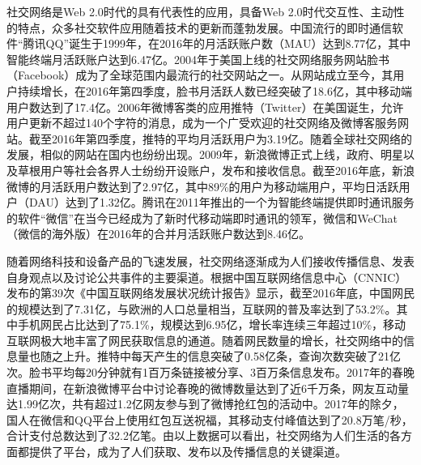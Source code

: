 社交网络是Web 2.0时代的具有代表性的应用，具备Web 2.0时代交互性、主动性的特点，众多社交软件应用随着技术的更新而蓬勃发展。中国流行的即时通信软件“腾讯QQ”诞生于1999年，在2016年的月活跃账户数（MAU）达到8.77亿，其中智能终端月活跃账户达到6.47亿。2004年于美国上线的社交网络服务网站脸书（Facebook）成为了全球范围内最流行的社交网站之一。从网站成立至今，其用户持续增长，在2016年第四季度，脸书月活跃人数已经突破了18.6亿，其中移动端用户数达到了17.4亿。2006年微博客类的应用推特（Twitter）在美国诞生，允许用户更新不超过140个字符的消息，成为一个广受欢迎的社交网络及微博客服务网站。截至2016年第四季度，推特的平均月活跃用户为3.19亿。随着全球社交网络的发展，相似的网站在国内也纷纷出现。2009年，新浪微博正式上线，政府、明星以及草根用户等社会各界人士纷纷开设账户，发布和接收信息。截至2016年底，新浪微博的月活跃用户数达到了2.97亿，其中89\%的用户为移动端用户，平均日活跃用户（DAU）达到了1.32亿。腾讯在2011年推出的一个为智能终端提供即时通讯服务的软件“微信”在当今已经成为了新时代移动端即时通讯的领军，微信和WeChat（微信的海外版）在2016年的合并月活跃账户数达到8.46亿。

随着网络科技和设备产品的飞速发展，社交网络逐渐成为人们接收传播信息、发表自身观点以及讨论公共事件的主要渠道。根据中国互联网络信息中心（CNNIC）发布的第39次《中国互联网络发展状况统计报告》显示，截至2016年底，中国网民的规模达到了7.31亿，与欧洲的人口总量相当，互联网的普及率达到了53.2\%。其中手机网民占比达到了75.1\%，规模达到6.95亿，增长率连续三年超过10\%，移动互联网极大地丰富了网民获取信息的通道。随着网民数量的增长，社交网络中的信息量也随之上升。推特中每天产生的信息突破了0.58亿条，查询次数突破了21亿次。脸书平均每20分钟就有1百万条链接被分享、3百万条信息发布。2017年的春晚直播期间，在新浪微博平台中讨论春晚的微博数量达到了近6千万条，网友互动量达1.99亿次，共有超过1.2亿网友参与到了微博抢红包的活动中。2017年的除夕，国人在微信和QQ平台上使用红包互送祝福，其移动支付峰值达到了20.8万笔/秒，合计支付总数达到了32.2亿笔。由以上数据可以看出，社交网络为人们生活的各方面都提供了平台，成为了人们获取、发布以及传播信息的关键渠道。


